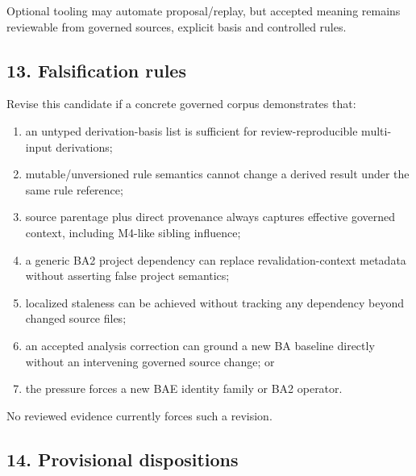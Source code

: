 \documentclass[11pt,a4paper]{article}
\providecommand{\tightlist}{\setlength{\itemsep}{0pt}\setlength{\parskip}{0pt}}
\begin{document}
Optional tooling may automate proposal/replay, but accepted meaning
remains reviewable from governed sources, explicit basis and controlled
rules.

\subsection{13. Falsification rules}\label{falsification-rules}

Revise this candidate if a concrete governed corpus demonstrates that:

\begin{enumerate}
\def\labelenumi{\arabic{enumi}.}
\tightlist
\item
  an untyped derivation-basis list is sufficient for review-reproducible
  multi-input derivations;
\item
  mutable/unversioned rule semantics cannot change a derived result
  under the same rule reference;
\item
  source parentage plus direct provenance always captures effective
  governed context, including M4-like sibling influence;
\item
  a generic BA2 project dependency can replace revalidation-context
  metadata without asserting false project semantics;
\item
  localized staleness can be achieved without tracking any dependency
  beyond changed source files;
\item
  an accepted analysis correction can ground a new BA baseline directly
  without an intervening governed source change; or
\item
  the pressure forces a new BAE identity family or BA2 operator.
\end{enumerate}

No reviewed evidence currently forces such a revision.

\subsection{14. Provisional
dispositions}\label{provisional-dispositions}
\end{document}
